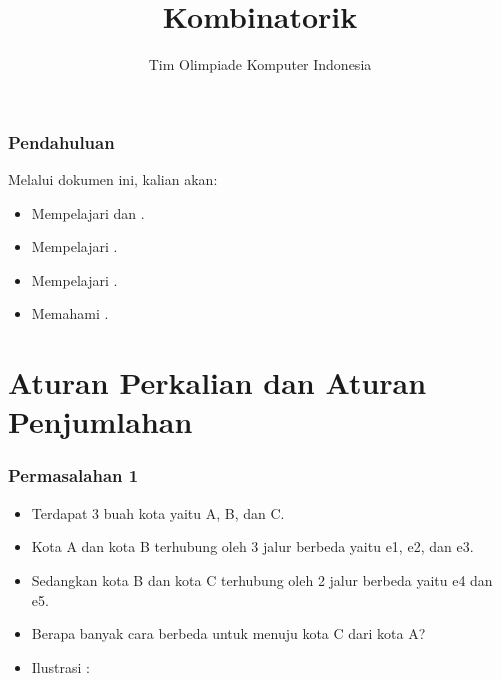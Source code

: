 
\usepackage{tikz}

\title{Kombinatorik}
\author{Tim Olimpiade Komputer Indonesia}
\date{}



\begin{frame}
\titlepage
\end{frame}

\begin{frame}
\frametitle{Pendahuluan}
Melalui dokumen ini, kalian akan:
\begin{itemize}
  \item Mempelajari  dan .
  \item Mempelajari .
  \item Mempelajari .
  \item Memahami .
\end{itemize}
\end{frame}

\section{Aturan Perkalian dan Aturan Penjumlahan}
\frame{\sectionpage}

\begin{frame}
\frametitle{Permasalahan 1}
\begin{itemize}
  \item Terdapat 3 buah kota yaitu A, B, dan C.
  \item Kota A dan kota B terhubung oleh 3 jalur berbeda yaitu e1, e2, dan e3.
  \item Sedangkan kota B dan kota C terhubung oleh 2 jalur berbeda yaitu e4 dan e5.
  \item Berapa banyak cara berbeda untuk menuju kota C dari kota A?
  \item Ilustrasi : 
  \newline
\end{itemize}
\end{frame}

